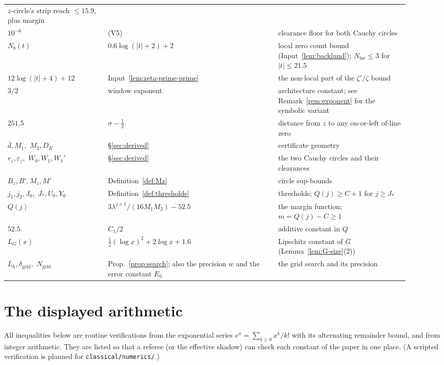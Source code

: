 \documentclass[11pt]{amsart}
\numberwithin{equation}{section}
\newcommand{\Sig}{\sigma}
\newcommand{\dbar}{\bar{d}}
\begin{document}
{\begin{longtable}{@{}p{0.23\linewidth}p{0.39\linewidth}p{0.30\linewidth}@{}}
$z$-circle's strip reach $\le 15.9$, plus margin\\
$10^{-6}$ & (V5) & clearance floor for both Cauchy circles\\
$N_b(t)$ & $0.6\log(|t|+2)+2$ & local zero count bound
(Input~\ref{lem:backlund}); $N_{\mathrm{loc}} \le 3$ for
$|t| \le 21.5$\\
$12\log(|t|+4)+12$ & Input~\ref{lem:zeta-prime-prime} & the
non-local part of the $\zeta'/\zeta$ bound\\
$3/2$ & window exponent & architecture constant;
see Remark~\ref{rem:exponent} for the symbolic variant\\
$251.5$ & $\Sig - \tfrac12$ & distance from $z$ to any on-or-left
of-line zero\\
$\dbar, M_1,$ $M_2, D_R$ & \S\ref{sec:derived} & certificate geometry\\
$r_z, \varepsilon_z,$ $W_0, W_1, W_1'$ & \S\ref{sec:derived} & the two
Cauchy circles and their clearances\\
$B_z, B', M_z, M'$ & Definition~\ref{def:Mz} & circle sup-bounds\\
$j_1, j_2, J_0,$ $J_*, U_0, Y_0$ & Definition~\ref{def:thresholds} &
thresholds; $Q(j) \ge C+1$ for $j \ge J_*$\\
$Q(j)$ & $3\lambda^{j+1}/(16M_1M_2) - 52.5$ & the margin function;
$m = Q(j) - C \ge 1$\\
$52.5$ & $C_1/2$ & additive constant in $Q$\\
$L_G(x)$ & $\tfrac12(\log x)^2 + 2\log x + 1.6$ & Lipschitz constant
of $G$ (Lemma~\ref{lem:G-size}(2))\\
$L_h, \delta_{\mathrm{grid}},$ $N_{\mathrm{grid}}$ &
Prop.~\ref{prop:search}; also the precision
$w$ and the error constant $E_0$ & the grid search and its precision\\
\hline
\end{longtable}
}

\appendix

\section{The displayed arithmetic}\label{sec:app:elementary}

All inequalities below are routine verifications from the exponential
series $e^x = \sum_{k \ge 0} x^k/k!$ with its alternating remainder
bound, and from integer arithmetic. They are listed so that a referee
(or the effective shadow) can check each constant of the paper in one
place. (A scripted verification is planned for
\texttt{classical/numerics/}.)
\end{document}
